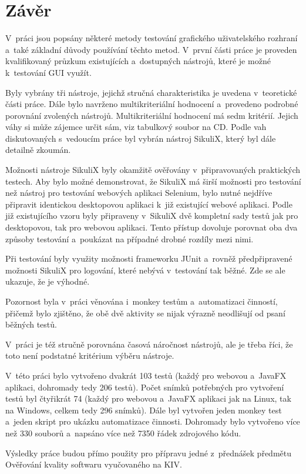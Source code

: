 \chapter{Závěr}
V~práci jsou popsány některé metody testování grafického uživatelského rozhraní a~také základní důvody používání těchto metod. V~první části práce je proveden kvalifikovaný průzkum existujících a~dostupných nástrojů, které je možné k~testování GUI využít.

Byly vybrány tři nástroje, jejichž stručná charakteristika je uvedena v~teoretické části práce. Dále bylo navrženo multikriteriální hodnocení a~provedeno podrobné porovnání zvolených nástrojů. Multikriteriální hodnocení má sedm kritérií. Jejich váhy si může zájemce určit sám, viz tabulkový soubor na CD. Podle vah diskutovaných s~vedoucím práce byl vybrán nástroj SikuliX, který byl dále detailně zkoumán.

Možnosti nástroje SikuliX byly okamžitě ověřovány v~připravovaných praktických testech. Aby bylo možné demonstrovat, že SikuliX má širší možnosti pro testování než nástroj pro testování webových aplikaci Selenium, bylo nutné nejdříve připravit identickou desktopovou aplikaci k~již existující webové aplikaci. Podle již existujícího vzoru byly připraveny v~SikuliX dvě kompletní sady testů jak pro desktopovou, tak pro webovou aplikaci. Tento přístup dovoluje porovnat oba dva způsoby testování a~poukázat na případné drobné rozdíly mezi nimi.

Při testování byly využity možnosti frameworku JUnit a~rovněž předpřipravené možnosti SikuliX pro logování, které nebývá v~testování tak běžné. Zde se ale ukazuje, že je výhodné.

Pozornost byla v~práci věnována i~monkey testům a~automatizaci činností, přičemž bylo zjištěno, že obě dvě aktivity se nijak výrazně neodlišují od psaní běžných testů.

V~práci je též stručně porovnána časová náročnost nástrojů, ale je třeba říci, že toto není podstatné kritérium výběru nástroje.

V~této práci bylo vytvořeno dvakrát 103 testů (každý pro webovou a~JavaFX aplikaci, dohromady tedy 206 testů). Počet snímků potřebných pro vytvoření testů byl čtyřikrát 74 (každý pro webovou a~JavaFX aplikaci jak na Linux, tak na Windows, celkem tedy 296 snímků). Dále byl vytvořen jeden monkey test a~jeden skript pro ukázku automatizace činnosti. Dohromady bylo vytvořeno více než 330 souborů a~napsáno více než 7350 řádek zdrojového kódu.

Výsledky práce budou přímo použity pro přípravu jedné z~přednášek předmětu Ověřování kvality softwaru vyučovaného na KIV.
